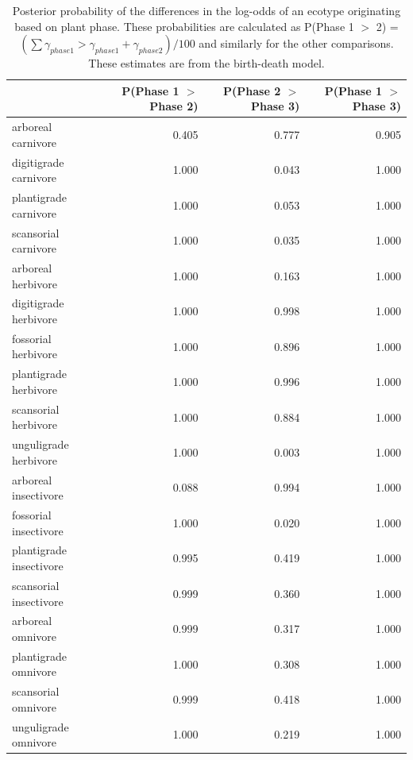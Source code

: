 \documentclass[12pt,letterpaper]{article}
\begin{document}
\begin{table}[ht]
  \centering
  \caption[Posterior probablity estimates of differences in origination by plant phase]{Posterior probability of the differences in the log-odds of an ecotype originating based on plant phase. These probabilities are calculated as P(Phase 1 \(>\) 2) = \( (\sum \gamma_{phase 1} > \gamma_{phase 1} + \gamma_{phase 2}) / 100\) and similarly for the other comparisons. These estimates are from the birth-death model.}
  \label{tab:origin_plant}
  \begin{tabular}{ l r r r }
    \hline
    & P(Phase 1 $>$ Phase 2) & P(Phase 2 $>$ Phase 3) & P(Phase 1 $>$ Phase 3) \\ 
    \hline
    arboreal carnivore & 0.405 & 0.777 & 0.905 \\ 
    digitigrade carnivore & 1.000 & 0.043 & 1.000 \\ 
    plantigrade carnivore & 1.000 & 0.053 & 1.000 \\ 
    scansorial carnivore & 1.000 & 0.035 & 1.000 \\ 
    arboreal herbivore & 1.000 & 0.163 & 1.000 \\ 
    digitigrade herbivore & 1.000 & 0.998 & 1.000 \\ 
    fossorial herbivore & 1.000 & 0.896 & 1.000 \\ 
    plantigrade herbivore & 1.000 & 0.996 & 1.000 \\ 
    scansorial herbivore & 1.000 & 0.884 & 1.000 \\ 
    unguligrade herbivore & 1.000 & 0.003 & 1.000 \\ 
    arboreal insectivore & 0.088 & 0.994 & 1.000 \\ 
    fossorial insectivore & 1.000 & 0.020 & 1.000 \\ 
    plantigrade insectivore & 0.995 & 0.419 & 1.000 \\ 
    scansorial insectivore & 0.999 & 0.360 & 1.000 \\ 
    arboreal omnivore & 0.999 & 0.317 & 1.000 \\ 
    plantigrade omnivore & 1.000 & 0.308 & 1.000 \\ 
    scansorial omnivore & 0.999 & 0.418 & 1.000 \\ 
    unguligrade omnivore & 1.000 & 0.219 & 1.000 \\ 
    \hline
  \end{tabular}
\end{table}
\end{document}

